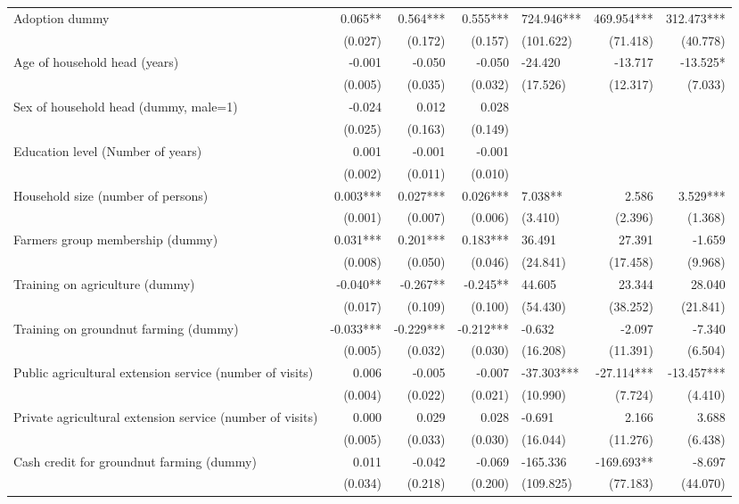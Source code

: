 \documentclass[
]{article}
\begin{document}
\begin{landscape}
\begin{longtable}[t]{lrrrlrr}
\endfoot
\bottomrule
\endlastfoot
Adoption dummy & 0.065** & 0.564*** & 0.555*** & 724.946*** & 469.954*** & 312.473***\\
 & (0.027) & (0.172) & (0.157) & (101.622) & (71.418) & (40.778)\\
Age of household head (years) & -0.001 & -0.050 & -0.050 & -24.420 & -13.717 & -13.525*\\
 & (0.005) & (0.035) & (0.032) & (17.526) & (12.317) & (7.033)\\
Sex of household head (dummy, male=1) & -0.024 & 0.012 & 0.028 &  &  & \\
\addlinespace
 & (0.025) & (0.163) & (0.149) &  &  & \\
Education level (Number of years) & 0.001 & -0.001 & -0.001 &  &  & \\
 & (0.002) & (0.011) & (0.010) &  &  & \\
Household size (number of persons) & 0.003*** & 0.027*** & 0.026*** & 7.038** & 2.586 & 3.529***\\
 & (0.001) & (0.007) & (0.006) & (3.410) & (2.396) & (1.368)\\
\addlinespace
Farmers group membership (dummy) & 0.031*** & 0.201*** & 0.183*** & 36.491 & 27.391 & -1.659\\
 & (0.008) & (0.050) & (0.046) & (24.841) & (17.458) & (9.968)\\
Training on agriculture (dummy) & -0.040** & -0.267** & -0.245** & 44.605 & 23.344 & 28.040\\
 & (0.017) & (0.109) & (0.100) & (54.430) & (38.252) & (21.841)\\
Training on groundnut farming (dummy) & -0.033*** & -0.229*** & -0.212*** & -0.632 & -2.097 & -7.340\\
\addlinespace
 & (0.005) & (0.032) & (0.030) & (16.208) & (11.391) & (6.504)\\
Public agricultural extension service (number of visits) & 0.006 & -0.005 & -0.007 & -37.303*** & -27.114*** & -13.457***\\
 & (0.004) & (0.022) & (0.021) & (10.990) & (7.724) & (4.410)\\
Private agricultural extension service (number of visits) & 0.000 & 0.029 & 0.028 & -0.691 & 2.166 & 3.688\\
 & (0.005) & (0.033) & (0.030) & (16.044) & (11.276) & (6.438)\\
\addlinespace
Cash credit for groundnut farming (dummy) & 0.011 & -0.042 & -0.069 & -165.336 & -169.693** & -8.697\\
 & (0.034) & (0.218) & (0.200) & (109.825) & (77.183) & (44.070)\\

\end{longtable}
\end{landscape}
\end{document}
